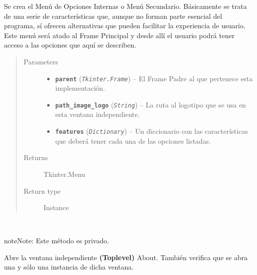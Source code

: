 \documentclass[class=report, crop=false]{standalone}
\begin{document}
\begin{fulllineitems}

\begin{DUlineblock}{0em}
\item[] Se crea el Menú de Opciones Internas o Menú Secundario.\break
Básicamente se trata de una serie de características que, aunque no
forman parte esencial del programa, sí ofrecen alternativas que 
pueden facilitar la experiencia de usuario.\break
Este menú será atado al Frame Principal y desde allí el usuario podrá
tener acceso a las opciones que aquí se describen.
\end{DUlineblock}

\begin{quote}\begin{description}
\item[{Parameters}] \leavevmode\begin{itemize}
\item \textbf{\texttt{parent}} (\emph{\texttt{Tkinter.Frame}}) -- El Frame Padre al que pertenece esta implementación.
\item \textbf{\texttt{path\_image\_logo}} (\emph{\texttt{String}}) -- La ruta al logotipo que se usa en esta ventana independiente.
\item \textbf{\texttt{features}} (\emph{\texttt{Dictionary}}) -- Un diccionario con las características que deberá tener cada una de las opciones listadas.
\end{itemize}

\item[{Returns}] \leavevmode
Tkinter.Menu
\item[{Return type}] \leavevmode
Instance
\end{description}\end{quote}


\begin{fulllineitems}

~

\begin{notice}{note}{Note:}
Este método es privado.
\end{notice}

Abre la ventana independiente \textbf{(Toplevel)} About.
También verifica que se abra una y sólo una instancia de 
dicha ventana.

\end{fulllineitems}


\end{fulllineitems}
\end{document}
